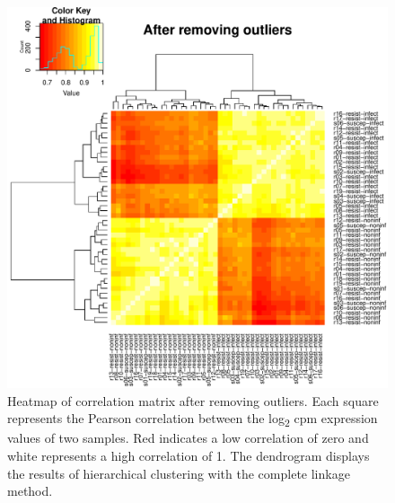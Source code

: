 \documentclass[fleqn,10pt]{wlscirep}
\begin{document}
\begin{figure}[ht]
\centering
\includegraphics[width=\linewidth]{../figure/heatmap-no-outliers.pdf}
\caption{
Heatmap of correlation matrix after removing outliers. Each square represents the Pearson correlation between the log\textsubscript{2} cpm expression values of two samples. Red indicates a low correlation of zero and white represents a high correlation of 1. The dendrogram displays the results of hierarchical clustering with the complete linkage method.
}
\label{fig:heat-filt}
\end{figure}
\end{document}
